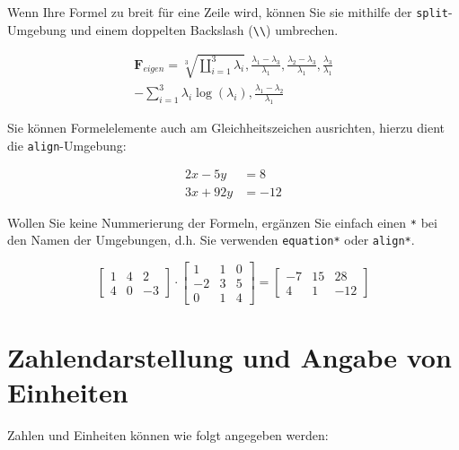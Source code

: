 Wenn Ihre Formel zu breit für eine Zeile wird, können Sie sie mithilfe der \texttt{split}-Umgebung und einem doppelten Backslash (\verb+\\+) umbrechen.

\begin{equation}
\label{eq:4}
\begin{split}
\mathbf{F}_{{eigen}}=\sqrt[3]{\coprod_{i=1}^{3} \lambda_{i}},
\frac{\lambda_{1}-\lambda_{3}}{\lambda_{1}},
\frac{\lambda_{2}-\lambda_{3}}{\lambda_{1}},
\frac{\lambda_{3}}{\lambda_{1}} \\-
\sum_{i=1}^{3} \lambda_{i} \log \left(\lambda_{i}\right),
\frac{\lambda_{1}-\lambda_{2}}{\lambda_{1}}
\end{split}
\end{equation}

Sie können Formelelemente auch am Gleichheitszeichen ausrichten, hierzu dient die \texttt{align}-Umgebung:

\begin{align}
2x - 5y &=  8 \\
3x + 92y &=  -12
\end{align}

Wollen Sie keine Nummerierung der Formeln, ergänzen Sie einfach einen \texttt{*} bei den Namen der Umgebungen, d.h. Sie verwenden \texttt{equation*} oder \texttt{align*}.

\begin{equation*}
\begin{bmatrix}
   1 &  4 &  2 \\
   4 &  0 & -3
\end{bmatrix}
        \cdot
\begin{bmatrix}
   1 &  1 &  0 \\
  -2 &  3 &  5 \\
   0 &  1 &  4
\end{bmatrix}
       {=}
\begin{bmatrix}
  -7 &  15 &  28 \\
   4 &   1 & -12
\end{bmatrix}
\end{equation*}

\section{Zahlendarstellung und Angabe von Einheiten}
Zahlen und Einheiten können wie folgt angegeben werden: 

